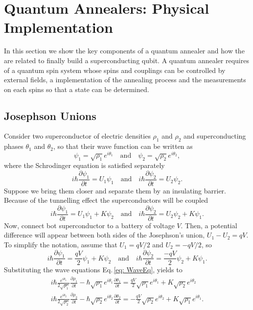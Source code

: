 \section{Quantum Annealers: Physical Implementation}
In this section we show the key components of a quantum annealer and how the are related to finally build a superconducting qubit. A quantum annealer requires of a quantum spin system whose spins and couplings can be controlled by external fields, a implementation of the annealing process and the measurements on each spins so that a state can be determined.
\subsection{Josephson Unions}
Consider two superconductor of electric densities $\rho_{1}$ and $\rho_{2}$ and superconducting phases $\theta_{1}$ and $\theta_{2}$, so that their wave function can be written as
\begin{equation}
\label{eq: WaveEq}
\psi_{1}=\sqrt{\rho_{1}}e^{i\theta_{1}} \quad \text{and} \quad\psi_{2}=\sqrt{\rho_{2}}e^{i\theta_{2}},
\end{equation}
where the Schrodinger equation is satisfied separately
\begin{equation}
i\hbar\frac{\partial \psi_{1}}{\partial t}=U_{1}\psi_{1} \quad \text{and} \quad i\hbar\frac{\partial \psi_{2}}{\partial t}=U_{2}\psi_{2}.
\end{equation}
Suppose we bring them closer and separate them by an insulating barrier. Because of the tunnelling effect the superconductors will be coupled
\begin{equation}
i\hbar\frac{\partial \psi_{1}}{\partial t}=U_{1}\psi_{1} + K\psi_{2} \quad \text{and} \quad i\hbar\frac{\partial \psi_{2}}{\partial t}=U_{2}\psi_{2} + K\psi_{1}.
\end{equation}
Now, connect bot superconductor to a battery of voltage $V$. Then, a potential difference will appear between both sides of the Josephson's union, $U_{1} - U_{2} =qV$. To simplify the notation, assume that $U_{1} = qV/2$ and $U_{2} = -qV/2$, so
\begin{equation}
i\hbar\frac{\partial \psi_{1}}{\partial t}=\frac{qV}{2}\psi_{1} + K\psi_{2} \quad \text{and} \quad i\hbar\frac{\partial \psi_{2}}{\partial t}=\frac{-qV}{2}\psi_{2} + K\psi_{1}.
\end{equation}
Substituting the wave equations Eq.\,\eqref{eq: WaveEq}, yields to
\begin{align}
i\hbar \frac{e^{i\theta_{1}}}{2\sqrt{\rho_{1}}}\frac{\partial \rho_{1}}{\partial t} - \hbar\sqrt{\rho_{1}}e^{i\theta_{1}}\frac{\partial\theta_{1}}{\partial t} = \frac{qV}{2}\sqrt{\rho_{1}}e^{i\theta_{1}} + K\sqrt{\rho_{2}}e^{i\theta_{2}} \\
i\hbar \frac{e^{i\theta_{2}}}{2\sqrt{\rho_{2}}}\frac{\partial \rho_{2}}{\partial t} - \hbar\sqrt{\rho_{2}}e^{i\theta_{2}}\frac{\partial\theta_{2}}{\partial t} = -\frac{qV}{2}\sqrt{\rho_{2}}e^{i\theta_{2}} + K\sqrt{\rho_{1}}e^{i\theta_{1}}.
\end{align}
